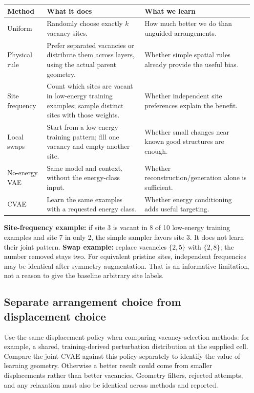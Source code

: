 \begin{tabularx}{\linewidth}{@{}p{2.3cm}YY@{}}
\toprule
Method & What it does & What we learn\\
\midrule
Uniform & Randomly choose exactly $k$ vacancy sites. & How much better we do than unguided arrangements.\\
Physical rule & Prefer separated vacancies or distribute them across layers, using the actual parent geometry. & Whether simple spatial rules already provide the useful bias.\\
Site frequency & Count which sites are vacant in low-energy training examples; sample distinct sites with those weights. & Whether independent site preferences explain the benefit.\\
Local swaps & Start from a low-energy training pattern; fill one vacancy and empty another site. & Whether small changes near known good structures are enough.\\
No-energy VAE & Same model and context, without the energy-class input. & Whether reconstruction/generation alone is sufficient.\\
CVAE & Learn the same examples with a requested energy class. & Whether energy conditioning adds useful targeting.\\
\bottomrule
\end{tabularx}

\textbf{Site-frequency example:} if site 3 is vacant in 8 of 10 low-energy training examples and site 7 in only 2, the simple sampler favors site 3. It does not learn their joint pattern. \textbf{Swap example:} replace vacancies $\{2,5\}$ with $\{2,8\}$; the number removed stays two. For equivalent pristine sites, independent frequencies may be identical after symmetry augmentation. That is an informative limitation, not a reason to give the baseline arbitrary site labels.

\subsection*{Separate arrangement choice from displacement choice}
Use the same displacement policy when comparing vacancy-selection methods: for example, a shared, training-derived perturbation distribution at the supplied cell. Compare the joint CVAE against this policy separately to identify the value of learning geometry. Otherwise a better result could come from smaller displacements rather than better vacancies. Geometry filters, rejected attempts, and any relaxation must also be identical across methods and reported.

